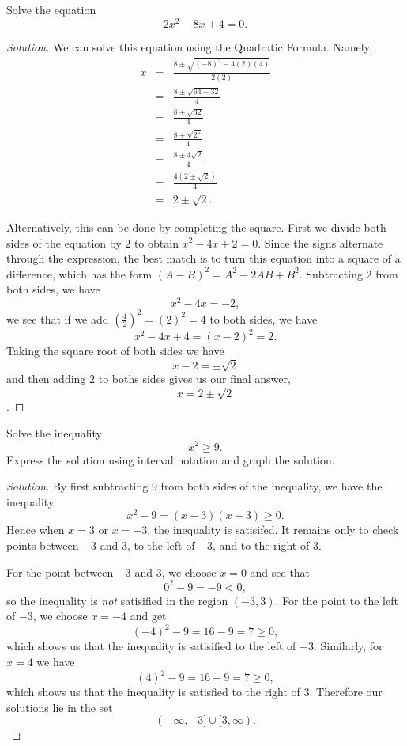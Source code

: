 \documentclass[12pt]{amsart}
\begin{document}
\begin{thm}[20 Points]\label{ex9}
  Solve the equation
  $$2x^2 - 8x + 4 = 0.$$

  \begin{proof}[Solution]
    We can solve this equation using the Quadratic Formula.
    Namely,
    \begin{eqnarray*}
      x &=& \frac{8 \pm \sqrt{(-8)^2 - 4(2)(4)}}{2(2)}\\
      &=& \frac{8 \pm \sqrt{64 - 32}}{4}\\
      &=& \frac{8 \pm \sqrt{32}}{4}\\
      &=& \frac{8 \pm \sqrt{2^5}}{4}\\
      &=& \frac{8 \pm 4\sqrt{2}}{4}\\
      &=& \frac{4(2 \pm \sqrt{2})}{4}\\
      &=& 2 \pm \sqrt{2}.
    \end{eqnarray*}

    Alternatively, this can be done by completing the square.
    First we divide both sides of the equation by $2$ to obtain $x^2 - 4x + 2 = 0.$
    Since the signs alternate through the expression, the best match is to turn this equation into a square of a difference, which has the form $(A - B)^2 = A^2 - 2AB + B^2$.
    Subtracting $2$ from both sides, we have 
    $$x^2 - 4x = -2,$$
    we see that if we add $\displaystyle{\left(\frac{4}{2}\right)^2} = (2)^2 = 4$ to both sides, we have
    $$x^2 - 4x + 4 = (x - 2)^2 = 2.$$
    Taking the square root of both sides we have 
    $$x - 2 = \pm \sqrt{2}$$
    and then adding $2$ to boths sides gives us our final answer,
    $$x = 2 \pm \sqrt{2}$$.
  \end{proof}
\end{thm}

\begin{thm}[20 Points]\label{ex10}
  Solve the inequality $$x^2 \geq 9.$$
  Express the solution using interval notation and graph the solution.
  
  \begin{proof}[Solution]
    By first subtracting $9$ from both sides of the inequality, we have the inequality
    $$x^2 - 9 = (x - 3)(x + 3) \geq 0.$$
    Hence when $x = 3$ or $x = -3$, the inequality is satisifed.
    It remains only to check points between $-3$ and $3$, to the left of $-3$, and to the right of $3$.

    For the point between $-3$ and $3$, we choose $x = 0$ and see that
    $$0^2 - 9 = -9 < 0,$$
    so the inequality is {\it not} satisified in the region $(-3,3)$.
    For the point to the left of $-3$, we choose $x = -4$ and get
    $$(-4)^2 - 9 = 16 - 9 = 7 \geq 0,$$
    which shows us that the inequality is satisified to the left of $-3$.
    Similarly, for $x = 4$ we have
    $$(4)^2 - 9 = 16 - 9 = 7 \geq 0,$$
    which shows us that the inequality is satisfied to the right of $3$.
    Therefore our solutions lie in the set
    $$(-\infty, -3] \cup [3, \infty).$$
  \end{proof}
\end{thm}
\end{document}

